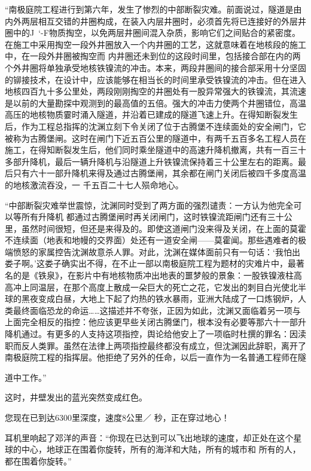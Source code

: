 \documentclass{article}
\begin{document}
“南极庭院工程进行到第六年，发生了惨烈的中部断裂灾难。前面说过，隧道是由内外两层相互交错的井圈构成，在装入内层井圈时，必须首先将已连接好的外层井圈中的J~‘-F物质掏空，以免两层井圈间混入杂质，影响它们之间贴合的紧密度。在施工中采用掏空一段外井圈放入一个内井圈的工艺，这就意味着在地核段的施工中，在一段外井圈被掏空而
\newpage
内井圈还未到位的这段时间里，包括接合部在内的两个外井圈将单独承受地核铁镍流的冲击。本来，两段井圈间的接合部采用十分坚固的铆接技术，在设计中，应该能够在相当长的时间里承受铁镍流的冲击。但在进入地核四百九十多公里处，两段刚刚掏空的井圈处有一股异常强大的铁镍流，其流速是以前的大量勘探中观测到的最高值的五倍。强大的冲击力使两个井圈错位，高温高压的地核物质霎时涌入隧道，并沿着已建成的隧道飞速上升。在得知断裂发生后，作为工程总指挥的沈渊立刻下令关闭了位于古腾堡不连续面处的安全闸门，它被称为古腾堡闸。这时在闸门下近五百公里的隧道中，有两千五百多名工程人员在施工，在得知断裂发生后，他们同时乘坐隧道中的高速升降机撤离，共有一百三十多部升降机，最后一辆升降机与沿隧道上升铁镍流保持着三十公里左右的距离。最后只有六十一部升降机来得及通过古腾堡闸，其余都在闸门关闭后被四千多度高温的地核激流吞没，一
千五百二十七人殒命地心。 

“中部断裂灾难举世震惊，沈渊同时受到了两方面的强烈谴责：一方认为他完全可以等所有升降机
\newpage
都通过古腾堡闸时再关闭闸门，这时铁镍流距闸门还有三十公里，虽然时间很短，但还是来得及的。即使这道闸门没来得及关闭，在上面的莫霍不连续面（地表和地幔的交界面）处还有一道安全闸——莫霍闻。那些遇难者的极端愤怒的家属控告沈渊故意杀人罪。对此，沈渊在媒体面前只有一句话：‘我怕出娄子啊。’这娄子确实出不得，在不止一部以南极庭院工程为题材的灾难片中，最著名的是《铁泉》，在影片中有地核物质冲出地表的噩梦般的景象：一股铁镍液柱高高冲上同温层，在那个高度上散成一朵巨大的死亡之花，它发出的刺目白光使北半球的黑夜变成白昼，大地上下起了灼热的铁水暴雨，亚洲大陆成了一口炼钢炉，人类最终面临恐龙的命运……这描述并不夸张，正因为如此，沈渊又面临着另一项与上面完全相反的指控：他应该更早些关闭古腾堡门，根本没有必要等那六十一部升降机通过。有更多的人支持这项指控，舆论给他安上了一项临时杜撰的罪名：因渎职而反人类罪。虽然在法律上两项指控最终都没有成立，但沈渊因此辞职，离开了南极庭院工程的指挥层。他拒绝了另外的任命，以后一直作为一名普通工程师在隧

\newpage
道中工作。” 


这时，井壁发出的蓝光突然变成红色。 

您现在已到达6300里深度，速度8公里／
秒，正在穿过地心！ 

耳机里响起了邓洋的声音：“你现在已达到可以飞出地球的速度，却正处在这个星球的中心，地球正在围着你旋转，所有的海洋和大陆，所有的城市和
所有的人，都在围着你旋转。” 
\end{document}
